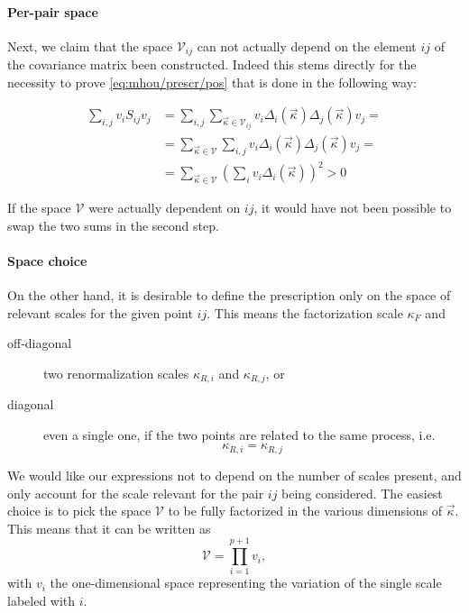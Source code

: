 \paragraph{Per-pair space} Next, we claim that the space $\mathcal{V}_{ij}$ can
not actually depend on the element $ij$ of the covariance matrix been
constructed. Indeed this stems directly for the necessity to prove
\cref{eq:mhou/prescr/pos} that is done in the following way:

\begin{align}
    \sum_{i,j} v_i S_{ij} v_j &= \sum_{i,j} \sum_{\vec{\kappa} \in \mathcal{V}_{ij}} v_i \Delta_i(\vec{\kappa})\Delta_j(\vec{\kappa}) v_j  =\\
        &= \sum_{\vec{\kappa} \in \mathcal{V}} \sum_{i,j} v_i \Delta_i(\vec{\kappa})\Delta_j(\vec{\kappa}) v_j =\\
        &= \sum_{\vec{\kappa} \in \mathcal{V}} \left(\sum_{i} v_i \Delta_i(\vec{\kappa})\right)^2 > 0
\end{align}

If the space $\mathcal{V}$ were actually dependent on $ij$, it would have not
been possible to swap the two sums in the second step.

\paragraph{Space choice} On the other hand, it is desirable to define the
prescription only on the space of relevant scales for the given point $ij$.
This means the factorization scale $\kappa_F$ and

\begin{description}
    \item[off-diagonal] two renormalization scales $\kappa_{R,i}$ and
        $\kappa_{R,j}$, or
    \item[diagonal] even a single one, if the two points are related to the
        same process, i.e. 
        \begin{equation*}
            \kappa_{R,i} = \kappa_{R,j}
        \end{equation*}
\end{description} 

We would like our expressions not to depend on the number of scales present,
and only account for the scale relevant for the pair $ij$ being considered.
The easiest choice is to pick the space $\mathcal{V}$ to be fully factorized in
the various dimensions of $\vec{\kappa}$. This means that it can be written as
\begin{equation}
\mathcal{V} = \prod_{i = 1}^{p+1} v_{i},
\end{equation}
with $v_{i}$ the one-dimensional space representing the variation of the single
scale labeled with $i$. 
\newline

